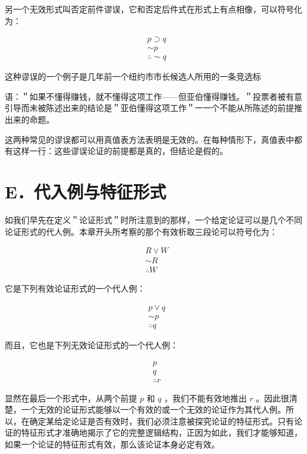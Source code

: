 另一个无效形式叫否定前件谬误，它和否定后件式在形式上有点相像，可以符号化为：

$$
\begin{aligned}
& p \supset q \\
& \sim p \\
& \therefore \sim q
\end{aligned}
$$

这种谬误的一个例子是几年前一个纽约市市长候选人所用的一条竞选标

语：＂如果不懂得赚钱，就不懂得这项工作——但亚伯懂得赚钱。＂投票者被有意引导而未被陈述出来的结论是＂亚伯懂得这项工作＂一一个不能从所陈述的前提推出来的命题。

这两种常见的谬误都可以用真值表方法表明是无效的。在每种情形下，真值表中都有这样一行：这些谬误论证的前提都是真的，但结论是假的。

\section*{E．代入例与特征形式}
如我们早先在定义＂论证形式＂时所注意到的那样，一个给定论证可以是几个不同论证形式的代人例。本章开头所考察的那个有效析取三段论可以符号化为：

$$
\begin{aligned}
& R \vee W \\
& \sim R \\
& \therefore W
\end{aligned}
$$

它是下列有效论证形式的一个代人例：

$$
\begin{aligned}
& p \vee q \\
& \sim p \\
& \therefore q
\end{aligned}
$$

而且，它也是下列无效论证形式的一个代人例：

$$
\begin{aligned}
& p \\
& q \\
& \therefore r
\end{aligned}
$$

显然在最后一个形式中，从两个前提 $p$ 和 $q$ ，我们不能有效地推出 $r$ 。因此很清楚，一个无效的论证形式能够以一个有效的或一个无效的论证作为其代人例。所以，在确定某给定论证是否有效时，我们必须注意被探究论证的特征形式。只有论证的特征形式才准确地揭示了它的完整逻辑结构，正因为如此，我们才能够知道，如果一个论证的特征形式有效，那么该论证本身必定有效。

